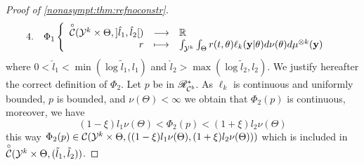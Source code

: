 \begin{proof}[Proof of \cref{nonasympt:thm:refnoconstr}]
\begin{equation*}
\begin{aligned}
            \text{4.}\quad& \Phi_1\left\{\begin{array}{rcl}
                \overset{\circ}{\mathcal{C}}({\mathcal{Y}^k}\times\Theta,]\hat l_1,\hat l_2[)&\longrightarrow&\mathbb{R}\\
                r&\longmapsto& \int_{\mathcal{Y}^k}\int_\Theta r(t,\theta)\ell_k(\mathbf{y}|\theta)d\nu(\theta)d\mu^{\otimes k}(\mathbf{y})
            \end{array}\right.
        \end{aligned}
    \end{equation*}
    where $0<\hat l_1<\min(\log\tilde l_1,l_1)$ and $\hat l_2>\max(\log\tilde l_2,l_2)$. %
    We justify hereafter the correct definition of $\Phi_2$. Let $p$ be in $\mathscr{R}_{\mathcal{C}^b}^\ast$. As $\ell_k$ is continuous and uniformly bounded, $p$ is bounded, and $\nu(\Theta)<\infty$ we obtain that $\Phi_2(p)$ is continuous, moreover, we have 
    \begin{equation}
        (1-\xi)l_1\nu(\Theta)<\Phi_2(p)<(1+\xi)l_2\nu(\Theta)
    \end{equation}
    this way $\Phi_2(p)\in\mathcal{C}({\mathcal{Y}^k}\times\Theta,((1-\xi)l_1\nu(\Theta),(1+\xi)l_2\nu(\Theta)))$ which is included in $\overset{\circ}{\mathcal{C}}({\mathcal{Y}^k}\times\Theta,(\tilde l_1,\tilde l_2))$.
    

\end{proof}

